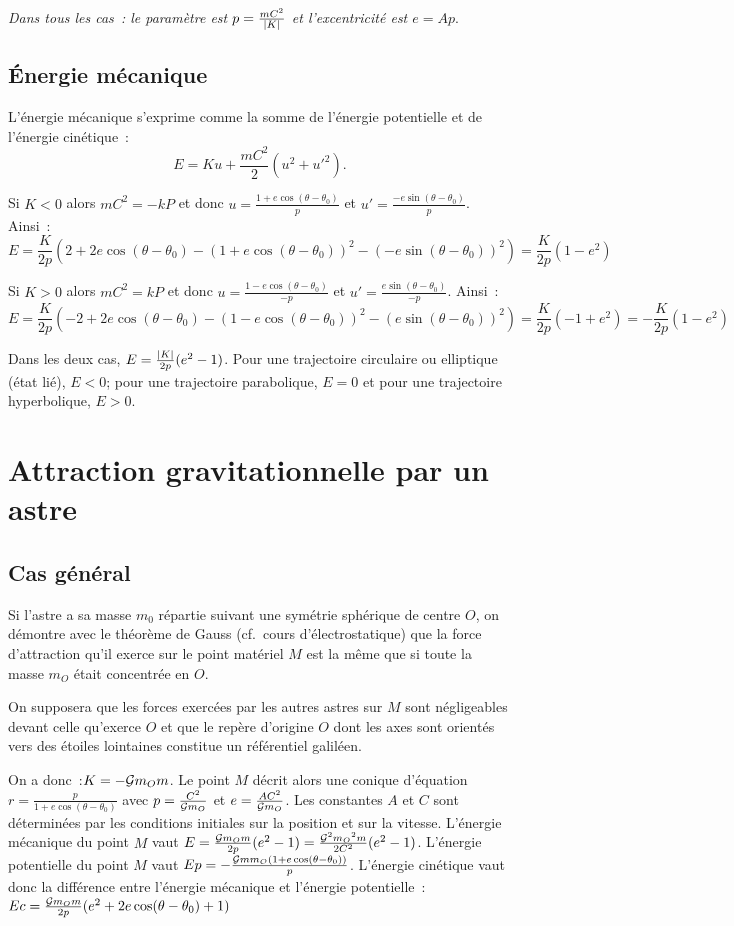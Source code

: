 \emph{Dans tous les cas~: le paramètre est \(p=\frac{mC^2}{\left\lvert K\right\rvert}\) et %
l'excentricité est \(e = Ap\)}.

\subsection{Énergie mécanique}%
L'énergie mécanique s'exprime comme la somme de l'énergie potentielle et de
l'énergie cinétique~: \[E = Ku + \frac{mC^2}{2}(u^2 + {u'}^2).\]

Si \(K<0\) alors \(mC^2 = -kP\) et donc \(u = \frac{1+e\cos(\theta -
\theta_0)}{p}\) et \(u' = \frac{-e\sin(\theta - \theta_0)}{p}\). Ainsi~:
\[E = \frac{K}{2p}\left(2+2e\cos(\theta-\theta_0) -
{(1+e\cos(\theta-\theta_0))}^2 - {(-e\sin(\theta-\theta_0))}^2\right) =
\frac{K}{2p}(1-e^2)\]%

Si \(K>0\) alors \(mC^2 = kP\) et donc \(u = \frac{1-e\cos(\theta -
\theta_0)}{-p}\) et \(u' = \frac{e\sin(\theta - \theta_0)}{-p}\). Ainsi~:
\[E = \frac{K}{2p}\left(-2+2e\cos(\theta-\theta_0) -
{(1-e\cos(\theta-\theta_0))}^2 - {(e\sin(\theta-\theta_0))}^2\right) =
\frac{K}{2p}(-1+e^2) = -\frac{K}{2p}(1-e^2)\]%

Dans les deux cas, \(E = \frac{\left\lvert K\right\rvert}{2p}(e^2-1)\). Pour une trajectoire
circulaire ou elliptique (état lié), \(E<0\); pour une trajectoire
parabolique, \(E=0\) et pour une trajectoire hyperbolique, \(E>0\).

\section{Attraction gravitationnelle par un astre}%
\subsection{Cas général}%

Si l'astre a sa masse \(m_0\) répartie suivant une symétrie sphérique de centre
\(O\), on démontre avec le théorème de Gauss (cf.\ cours d'électrostatique) que
la force d'attraction qu'il exerce sur le point matériel \(M\) est la même que
si toute la masse \(m_O\) était concentrée en \(O\).

On supposera que les forces exercées par les autres astres sur \(M\) sont
négligeables devant celle qu'exerce \(O\) et que le repère d'origine \(O\) dont
les axes sont orientés vers des étoiles lointaines constitue un référentiel
galiléen.

On a donc~:\(K = -\mathcal{G} m_O m\). Le point \(M\) décrit alors une conique
d'équation \(r = \frac{p}{1+e\cos(\theta - \theta_0)}\) avec \(p =
\frac{C^2}{\mathcal{G} m_O}\) et \(e = \frac{AC^2}{\mathcal{G} m_O}\). Les constantes \(A\) et%
\(C\) sont déterminées par les conditions initiales sur la position et sur la
vitesse. L'énergie mécanique du point \(M\) vaut \(E = \frac{\mathcal{G} m_O
m}{2p}(e^2-1) = \frac{\mathcal{G}^2{m_O}^2m}{2C^2}(e^2-1)\). L'énergie potentielle du
point \(M\) vaut \(Ep = -\frac{\mathcal{G} m m_O (1+e\cos(\theta-\theta_0))}{p}\).
L'énergie cinétique vaut donc la différence entre l'énergie mécanique et
l'énergie potentielle~: \(Ec = \frac{\mathcal{G} m_O m}{2p}(e^2 +
2e\cos(\theta-\theta_0)+1)\)

